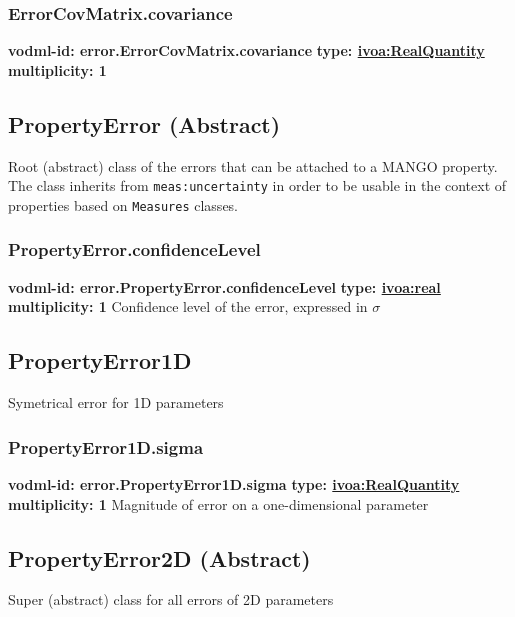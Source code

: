     \subsubsection{ErrorCovMatrix.covariance}
      \textbf{vodml-id: error.ErrorCovMatrix.covariance} \newline
      \textbf{type: \hyperref[sect:ivoa]{ivoa:RealQuantity}} \newline
      \textbf{multiplicity: 1} \newline 
      

  \subsection{PropertyError (Abstract)}
  \label{sect:error.PropertyError}
    Root (abstract) class of the errors that can be attached to a MANGO property. The class inherits from \texttt{meas:uncertainty} in order to be usable in the context of properties based on \texttt{Measures} classes.

    \subsubsection{PropertyError.confidenceLevel}
      \textbf{vodml-id: error.PropertyError.confidenceLevel} \newline
      \textbf{type: \hyperref[sect:ivoa]{ivoa:real}} \newline
      \textbf{multiplicity: 1} \newline 
      Confidence level of the error, expressed in $\sigma$

  \subsection{PropertyError1D}
  \label{sect:error.PropertyError1D}
    Symetrical error for 1D parameters

    \subsubsection{PropertyError1D.sigma}
      \textbf{vodml-id: error.PropertyError1D.sigma} \newline
      \textbf{type: \hyperref[sect:ivoa]{ivoa:RealQuantity}} \newline
      \textbf{multiplicity: 1} \newline 
      Magnitude of error on a one-dimensional parameter

  \subsection{PropertyError2D (Abstract)}
  \label{sect:error.PropertyError2D}
    Super (abstract) class for all errors of 2D parameters

